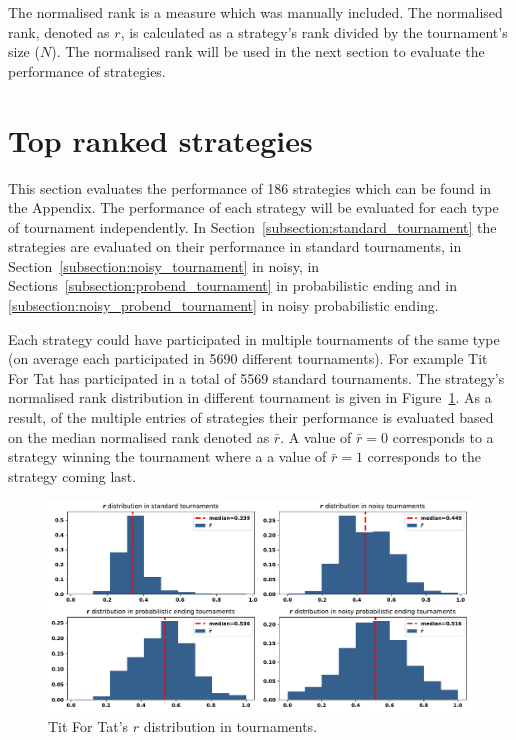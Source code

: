\documentclass{article}
\begin{document}
The normalised rank is a measure which was manually included. The normalised
rank, denoted as $r$, is calculated as a strategy's rank divided by the
tournament's size ($N$). The normalised rank will be used in the next section to
evaluate the performance of strategies.

\section{Top ranked strategies}\label{section:top_performances}

This section evaluates the performance of 186 strategies which can be found in
the Appendix. The performance of each strategy will be evaluated for each type
of tournament independently. In Section~\ref{subsection:standard_tournament} the
strategies are evaluated on their performance in standard tournaments, in
Section~\ref{subsection:noisy_tournament} in noisy, in
Sections~\ref{subsection:probend_tournament} in probabilistic ending and in
\ref{subsection:noisy_probend_tournament} in noisy probabilistic ending.

Each strategy could have participated in multiple tournaments of the same type
(on average each participated in 5690 different tournaments). For example Tit
For Tat has participated in a total of 5569 standard tournaments. The strategy's
normalised rank distribution in different tournament is given in
Figure~\ref{fig:tit_for_tat_r_distribution}. As a result, of the multiple
entries of strategies their performance is evaluated based on the median
normalised rank denoted as \(\bar{r}\). A value of \(\bar{r} = 0\) corresponds
to a strategy winning the tournament where a a value of \(\bar{r} = 1\)
corresponds to the strategy coming last.

\begin{figure}[!htbp]
    \centering
    \includegraphics[width=.8\textwidth]{../images/tit_for_tat_r_distributions.pdf}
    \caption{Tit For Tat's $r$ distribution in tournaments.}
    \label{fig:tit_for_tat_r_distribution}
\end{figure}
\end{document}
